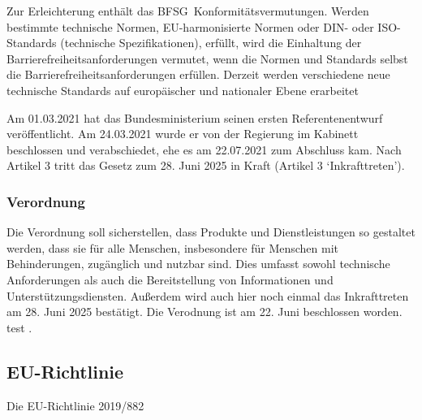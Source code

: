 Zur Erleichterung enthält das BFSG Konformitätsvermutungen. Werden bestimmte technische Normen, EU-harmonisierte Normen oder DIN- oder ISO-Standards (technische Spezifikationen), erfüllt, wird die Einhaltung der Barrierefreiheitsanforderungen vermutet, wenn die Normen und Standards selbst die Barrierefreiheitsanforderungen erfüllen. Derzeit werden verschiedene neue technische Standards auf europäischer und nationaler Ebene erarbeitet

Am 01.03.2021 hat das Bundesministerium seinen ersten Referentenentwurf veröffentlicht. Am 24.03.2021 wurde er von der Regierung im Kabinett beschlossen und verabschiedet, ehe es am 22.07.2021 zum Abschluss kam.
Nach Artikel 3 tritt das Gesetz zum 28. Juni 2025 in Kraft (Artikel 3 ‘Inkrafttreten’).


\subsubsection{Verordnung}
Die Verordnung \citep{bmas_verodnung_bfsg} soll sicherstellen, dass Produkte und Dienstleistungen so gestaltet werden, dass sie für alle Menschen, insbesondere für Menschen mit Behinderungen, zugänglich und nutzbar sind. Dies umfasst sowohl technische Anforderungen als auch die Bereitstellung von Informationen und Unterstützungsdiensten. Außerdem wird auch hier noch einmal das Inkrafttreten am 28. Juni 2025 bestätigt. Die Verodnung ist am 22. Juni beschlossen worden. test \citep[vgl.][]{bmas_verordnung_bfsg_pdf}.

\subsection{EU-Richtlinie}
Die EU-Richtlinie 2019/882 \citep{eu_richtlinie_2019/882}